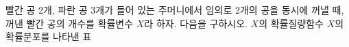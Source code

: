 빨간 공 2개, 파란 공 3개가 들어 있는 주머니에서 임의로 2개의 공을 동시에 꺼낼 때, 꺼낸 빨간 공의 개수를 확률변수 $X$라 하자. 다음을 구하시오.
 $X$의 확률질량함수
 $X$의 확률분포를 나타낸 표
